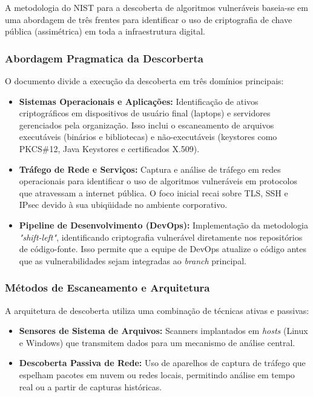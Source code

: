         A metodologia do NIST para a descoberta de algoritmos vulneráveis baseia-se em uma abordagem de três frentes para identificar o uso de criptografia de chave pública (assimétrica) em toda a infraestrutura digital.\cite{nistSP180038B}

        \subsubsection{Abordagem Pragmatica da Descorberta}
            O documento divide a execução da descoberta em três domínios principais:

            \begin{itemize}
                \item \textbf{Sistemas Operacionais e Aplicações:} Identificação de ativos criptográficos em dispositivos de usuário final (laptops) e servidores gerenciados pela organização. Isso inclui o escaneamento de arquivos executáveis (binários e bibliotecas) e não-executáveis (keystores como PKCS\#12, Java Keystores e certificados X.509).

                \item \textbf{Tráfego de Rede e Serviços:} Captura e análise de tráfego em redes operacionais para identificar o uso de algoritmos vulneráveis em protocolos que atravessam a internet pública. O foco inicial recai sobre TLS, SSH e IPsec devido à sua ubiqüidade no ambiente corporativo.

                \item \textbf{Pipeline de Desenvolvimento (DevOps):} Implementação da metodologia \textit{"shift-left"}, identificando criptografia vulnerável diretamente nos repositórios de código-fonte. Isso permite que a equipe de DevOps atualize o código antes que as vulnerabilidades sejam integradas ao \textit{branch} principal.
            \end{itemize}\cite{nistSP180038B}

        \subsubsection{Métodos de Escaneamento e Arquitetura}

            A arquitetura de descoberta utiliza uma combinação de técnicas ativas e passivas:

            \begin{itemize}
                \item \textbf{Sensores de Sistema de Arquivos:} Scanners implantados em \textit{hosts} (Linux e Windows) que transmitem dados para um mecanismo de análise central.

                \item \textbf{Descoberta Passiva de Rede:} Uso de aparelhos de captura de tráfego que espelham pacotes em nuvem ou redes locais, permitindo análise em tempo real ou a partir de capturas históricas.
            \end{itemize}\cite{nistSP180038B}

